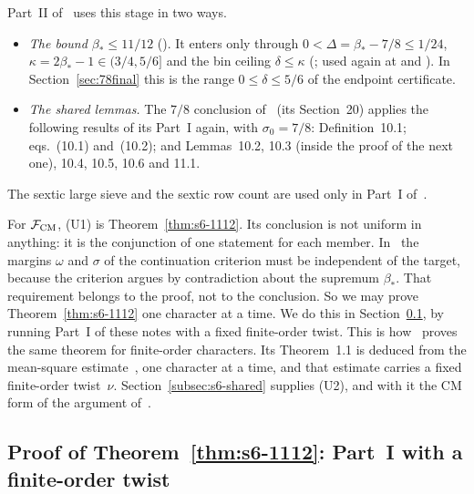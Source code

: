 \documentclass[11pt]{article}
\numberwithin{equation}{section}
\begin{document}
Part~II of~\cite{OAI78} uses this stage in two ways.
\begin{itemize}
\item[(U1)] \emph{The bound $\beta_*\le11/12$} (\cite[Section~12]{OAI78}). It enters only through
 $0<\Delta=\beta_*-7/8\le1/24$, $\kappa=2\beta_*-1\in(3/4,5/6]$ and the bin ceiling $\delta\le\kappa$
 (\cite[eqs.~(12.1) and~(12.2)]{OAI78}; used again at \cite[Section~19.2]{OAI78} and \cite[proof of Proposition~20.3]{OAI78}). In
 Section~\ref{sec:78final} this is the range $0\le\delta\le5/6$ of the endpoint certificate.
\item[(U2)] \emph{The shared lemmas.} The $7/8$ conclusion of~\cite{OAI78} (its Section~20) applies the following results of its Part~I again, with $\sigma_0=7/8$:
 Definition~10.1; eqs.~(10.1) and~(10.2); and
 Lemmas~10.2, 10.3 (inside the proof of the next one),
 10.4, 10.5, 10.6 and
 11.1.
\end{itemize}
The sextic large sieve and the sextic row count are used only in Part~I of~\cite{OAI78}.

For $\mathcal F_{\rm CM}$, (U1) is Theorem~\ref{thm:s6-1112}. Its conclusion is not uniform in anything: it
is the conjunction of one statement for each member. In~\cite{OAI78} the margins $\omega$ and $\sigma$ of the
continuation criterion must be independent of the target, because the criterion argues by contradiction
about the supremum $\beta_*$. That requirement belongs to the proof, not to the conclusion. So we may prove
Theorem~\ref{thm:s6-1112} one character at a time. We do this in Section~\ref{subsec:s6-twist}, by running
Part~I of these notes with a fixed finite-order twist. This is how~\cite{OAI1112} proves the same theorem for
finite-order characters. Its Theorem~1.1 is deduced from the mean-square
estimate~\cite[Proposition~3.1]{OAI1112}, one character at a time, and that estimate carries a fixed
finite-order twist~$\nu$. Section~\ref{subsec:s6-shared} supplies (U2), and with it the CM form of the
argument of~\cite{OAI78}.

\subsection{Proof of Theorem~\ref{thm:s6-1112}: Part~I with a finite-order twist}\label{subsec:s6-twist}
\end{document}
